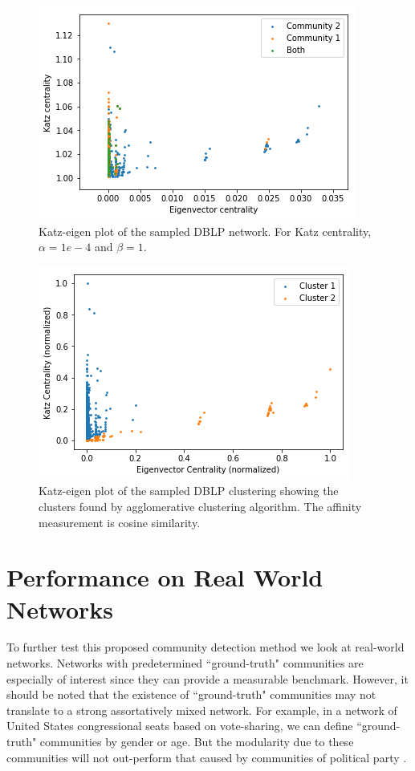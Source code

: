 \documentclass{IEEEtran}
\begin{document}
	\begin{figure}
	\centering
	\includegraphics[width=0.98\linewidth]{dblp_2_kev.png}
	\caption{Katz-eigen plot of the sampled DBLP network. For Katz centrality, $\alpha = 1e-4$ and $\beta = 1$.}
	\label{fig:dblp_pre}
	\end{figure}

	\begin{figure}
	\centering
	\includegraphics[width=0.98\linewidth]{dblp_cluster.png}
	\caption{Katz-eigen plot of the sampled DBLP clustering showing the clusters found by agglomerative clustering algorithm. The affinity measurement is cosine similarity.}
	\label{fig:dblp_cluster}
	\end{figure}

	\section{Performance on Real World Networks}
	\label{s:realWorld}
	To further test this proposed community detection method we look at real-world networks. Networks with predetermined ``ground-truth" communities are especially of interest since they can provide a measurable benchmark. However, it should be noted that the existence of ``ground-truth" communities may not translate to a strong assortatively mixed network. For example, in a network of United States congressional seats based on vote-sharing, we can define ``ground-truth" communities by gender or age. But the modularity due to these communities will not out-perform that caused by communities of political party \cite{congress}.
	
\end{document}
